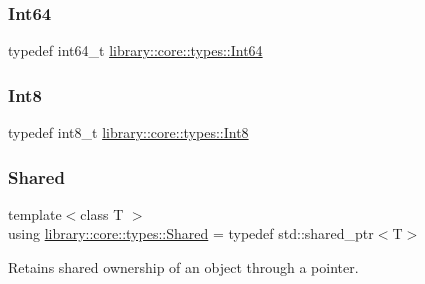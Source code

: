 \mbox{\label{namespacelibrary_1_1core_1_1types_aaa5045e0d51ac9cff3c0aeff2b792c8c}} 
\subsubsection{\texorpdfstring{Int64}{Int64}}
{\footnotesize\ttfamily typedef int64\+\_\+t \mbox{\hyperlink{namespacelibrary_1_1core_1_1types_aaa5045e0d51ac9cff3c0aeff2b792c8c}{library\+::core\+::types\+::\+Int64}}}

\mbox{\label{namespacelibrary_1_1core_1_1types_a31bb31acb8e07271b66571cf8e6eafee}} 
\subsubsection{\texorpdfstring{Int8}{Int8}}
{\footnotesize\ttfamily typedef int8\+\_\+t \mbox{\hyperlink{namespacelibrary_1_1core_1_1types_a31bb31acb8e07271b66571cf8e6eafee}{library\+::core\+::types\+::\+Int8}}}

\mbox{\label{namespacelibrary_1_1core_1_1types_a3dae1a00f899bac0366794fa85eda8ee}} 
\subsubsection{\texorpdfstring{Shared}{Shared}}
{\footnotesize\ttfamily template$<$class T $>$ \\
using \mbox{\hyperlink{namespacelibrary_1_1core_1_1types_a3dae1a00f899bac0366794fa85eda8ee}{library\+::core\+::types\+::\+Shared}} = typedef std\+::shared\+\_\+ptr$<$T$>$}



Retains shared ownership of an object through a pointer. 

\mbox{\label{namespacelibrary_1_1core_1_1types_a701626ea1027888ebbb8cfd0ff7adab0}} 
